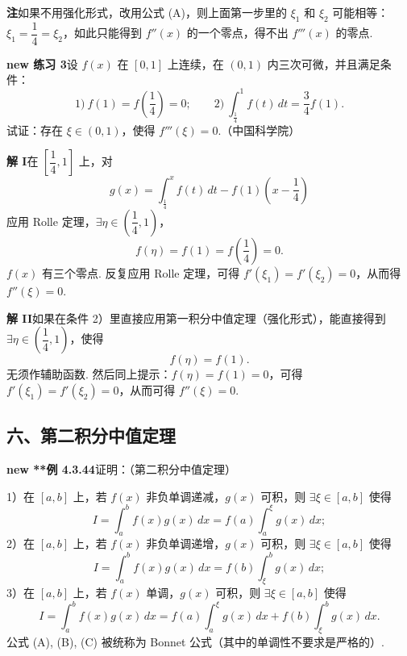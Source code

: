 \documentclass[UTF8,12pt,a4paper,fontset=fandol]{ctexart}
\begin{document}
\noindent\textbf{注}\quad 如果不用强化形式，改用公式 (A)，则上面第一步里的 $\xi_1$ 和 $\xi_2$ 可能相等：$\xi_1=\dfrac14=\xi_2$，如此只能得到 $f''(x)$ 的一个零点，得不出 $f'''(x)$ 的零点.

\noindent\textbf{new 练习 3}\quad 设 $f(x)$ 在 $[0,1]$ 上连续，在 $(0,1)$ 内三次可微，并且满足条件：
\[
1)\ f(1)=f\left(\frac14\right)=0;\qquad
2)\ \int_{\frac14}^1f(t)\,dt=\frac34f(1).
\]
试证：存在 $\xi\in(0,1)$，使得 $f'''(\xi)=0$.（中国科学院）

\noindent\textbf{解 I}\quad 在 $\left[\dfrac14,1\right]$ 上，对
\[
g(x)=\int_{\frac14}^x f(t)\,dt-f(1)\left(x-\frac14\right)
\]
应用 Rolle 定理，$\exists\eta\in\left(\dfrac14,1\right)$，
\[
f(\eta)=f(1)=f\left(\frac14\right)=0.
\]
$f(x)$ 有三个零点. 反复应用 Rolle 定理，可得 $f'(\xi_1)=f'(\xi_2)=0$，从而得
$f''(\xi)=0$.

\noindent\textbf{解 II}\quad 如果在条件 2）里直接应用第一积分中值定理（强化形式），能直接得到 $\exists\eta\in\left(\dfrac14,1\right)$，使得
\[
f(\eta)=f(1).
\]
无须作辅助函数. 然后同上提示：$f(\eta)=f(1)=0$，可得 $f'(\xi_1)=f'(\xi_2)=0$，从而可得 $f''(\xi)=0$.

\subsection*{六、第二积分中值定理}

\noindent\textbf{new **例 4.3.44}\quad 证明：（第二积分中值定理）

1）在 $[a,b]$ 上，若 $f(x)$ 非负单调递减，$g(x)$ 可积，则 $\exists\xi\in[a,b]$ 使得
\[
I=\int_a^b f(x)g(x)\,dx=f(a)\int_a^\xi g(x)\,dx;
\tag{A}
\]
2）在 $[a,b]$ 上，若 $f(x)$ 非负单调递增，$g(x)$ 可积，则 $\exists\xi\in[a,b]$ 使得
\[
I=\int_a^b f(x)g(x)\,dx=f(b)\int_\xi^b g(x)\,dx;
\tag{B}
\]
3）在 $[a,b]$ 上，若 $f(x)$ 单调，$g(x)$ 可积，则 $\exists\xi\in[a,b]$ 使得
\[
I=\int_a^b f(x)g(x)\,dx=f(a)\int_a^\xi g(x)\,dx+f(b)\int_\xi^b g(x)\,dx.
\tag{C}
\]
公式 (A), (B), (C) 被统称为 Bonnet 公式（其中的单调性不要求是严格的）.
\end{document}
